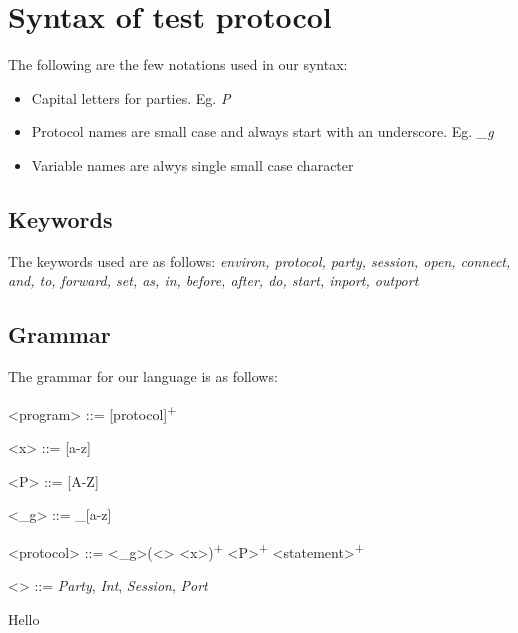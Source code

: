 
\section{Syntax of test protocol}
\label{sec:syntax-test}

The following are the few notations used in our syntax:

\begin{itemize}                 
\item Capital letters for parties. Eg. \textit{P} 
\item Protocol names are small case and always start with an underscore. Eg. \textit{_g}
  \item Variable names are alwys single small case character
  \end{itemize}
  
\subsection{Keywords}
The keywords used are as follows:
\textit{environ, protocol, party, session, open, connect, and, to, forward, set, as, in,
before, after, do, start, inport, outport}

\subsection{Grammar}
The grammar for our language is as follows:

\begin{grammar}
  <program> ::= [protocol]\textsuperscript{+}

  <x> ::= [a-z] 

  <P> ::= [A-Z]

  <_g> ::= _[a-z]
  
  <protocol> ::= <_g>\lit{(}(<\texttau > <x>)\textsuperscript{+}\lit{)} <P>\textsuperscript{+} \lit{\{} <statement>\textsuperscript{+} \lit{\}}

  <\texttau > ::= \textit{Party}, \textit{Int}, \textit{Session}, \textit{Port}

\end{grammar}

Hello